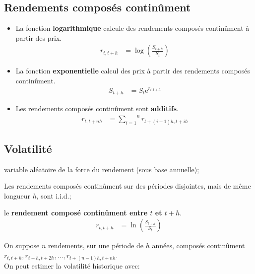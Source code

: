 \documentclass[10pt, french]{article}
\begin{document}
\begin{multicols*}{2}
\subsection{Rendements composés continûment}
\begin{itemize}
	\item	La fonction \textbf{logarithmique} calcule des rendements composés continûment à partir des prix.
		\begin{align*}
		r_{t, t + h} &= \log\left(\frac{S_{t + h}}{S_{t}}\right)
		\end{align*}
	\item	La fonction \textbf{exponentielle} calcul des prix à partir des rendements composés continûment.
		\begin{align*}
		S_{t + h}	&=	S_{t}\textrm{e}^{r_{t, t + h}}
		\end{align*}
	\item	Les rendements composés continûment sont \textbf{additifs}.
		\begin{align*}
		r_{t, t + nh}	&=	\overset{n}{\underset{i = 1}{\sum}} r_{t + (i - 1)h, t + ih}
		\end{align*}
\end{itemize}	

	
\subsection{Volatilité}

\begin{distributions}[Notation]
\begin{description}[leftmargin = *]
	\item[$R$]	variable aléatoire de la force du rendement (sous base annuelle);
	\item[Hypothèse]	Les rendements composés continûment sur des périodes disjointes, mais de même longueur $h$, sont i.i.d.;
	\item[$r_{t, t + h}$]	le \textbf{rendement composé continûment entre $t$ et $t + h$}.
		\begin{align*}
		r_{t, t + h} &= \ln\left(\frac{S_{t + h}}{S_{t}}\right)
		\end{align*}
\end{description}
\end{distributions}

On suppose $n$ rendements, sur une période de $h$ années, composés continûment $r_{t, t + h}, r_{t + h, t + 2h}, \dots, r_{t + (n - 1)h, t + nh}$. \\
On peut estimer la volatilité historique avec:


\end{multicols*}
\end{document}
